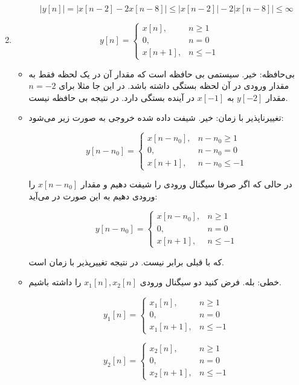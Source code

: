 \documentclass[12pt]{article}
\begin{document}
\begin{enumerate}[label = \harfi*)]
\begin{itemize}
	$$|y[n]| = |x[n-2] - 2x[n-8]| \leq |x[n-2]| - 2|x[n-8]| \leq \infty$$
\end{itemize}


\item
$$
y[n]=\left\{\begin{array}{lc}
	x[n], & n \geq 1 \\
	0, & n=0 \\
	x[n+1], & n \leq-1
\end{array}\right.
$$
\begin{itemize}
	\item
	بی‌حافظه: خیر. سیستمی بی حافظه است که مقدار آن در یک لحظه فقط به مقدار ورودی در آن لحظه بستگی داشته باشد. در این جا مثلا برای $n=-2$ مقدار $y[-2]$ به $x[-1]$ در آینده بستگی دارد. در نتیجه بی حافظه نیست.
	\item
	تغییرناپذیر با زمان: خیر. شیفت داده شده خروجی به صورت زیر می‌شود:
	
$$
y[n-n_0]=\left\{\begin{array}{lc}
	x[n-n_0], & n-n_0 \geq 1 \\
	0, & n-n_0=0 \\
	x[n+1], & n-n_0 \leq-1
\end{array}\right.
$$	 

در حالی که اگر صرفا سیگنال ورودی را شیفت دهیم و مقدار 
$x[n-n_0]$
را ورودی دهیم به این صورت در می‌آید:

$$
y[n-n_0]=\left\{\begin{array}{lc}
	x[n-n_0], & n \geq 1 \\
	0, & n=0 \\
	x[n+1], & n \leq-1
\end{array}\right.
$$	 

که با قبلی برابر نیست. در نتیجه تغییرپذیر با زمان است.
	
	 
	\item
	خطی: بله. فرض کنید دو سیگنال ورودی
	$x_1[n] , x_2[n]$
	را داشته باشیم.
	
	$$
	y_1[n]=\left\{\begin{array}{lc}
		x_1[n], & n \geq 1 \\
		0, & n=0 \\
		x_1[n+1], & n \leq-1
	\end{array}\right.
	$$
	
		
	$$
	y_2[n]=\left\{\begin{array}{lc}
		x_2[n], & n \geq 1 \\
		0, & n=0 \\
		x_2[n+1], & n \leq-1
	\end{array}\right.
	$$
	

\end{itemize}
\end{enumerate}
\end{document}
